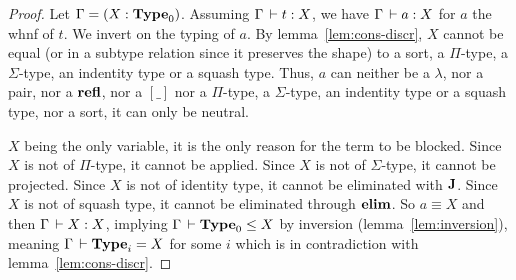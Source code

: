 \documentclass[a4paper,english]{lipics-utf8x}
\begin{document}
  \begin{proof}
    Let $\Gamma = (X : \operatorname{\mathbf{Type}}_0)$.
    Assuming $\Gamma \,\vdash t : X$, we have $\Gamma \,\vdash a : X$ for $a$ the whnf
    of $t$. We invert on the typing of $a$.
    By lemma~\ref{lem:cons-discr}, $X$ cannot be equal (or in a subtype
    relation since it preserves the shape) to a sort, a $\Pi$-type, a
    $\Sigma$-type, an indentity type or a squash type.
    Thus, $a$ can neither be a $\lambda$, nor a pair, nor a $\operatorname{\mathbf{refl}}$,
    nor a $[\_]$ nor a $\Pi$-type, a $\Sigma$-type, an indentity type or
    a squash type, nor a sort, it can only be neutral.

    $X$ being the only variable, it is the only reason for the term to be
    blocked.
    Since $X$ is not of $\Pi$-type, it cannot be applied.
    Since $X$ is not of $\Sigma$-type, it cannot be projected.
    Since $X$ is not of identity type, it cannot be eliminated with $\operatorname{\mathbf{J}}$.
    Since $X$ is not of squash type, it cannot be eliminated through $\operatorname{\mathbf{elim}}$.
    So $a \equiv X$ and then $\Gamma \,\vdash X : X$, implying
    $\Gamma \,\vdash \operatorname{\mathbf{Type}}_0 \le X$ by inversion
    (lemma~\ref{lem:inversion}), meaning $\Gamma \,\vdash \operatorname{\mathbf{Type}}_i = X$ for some
    $i$ which is in contradiction with lemma~\ref{lem:cons-discr}.
  \end{proof}
\end{document}
